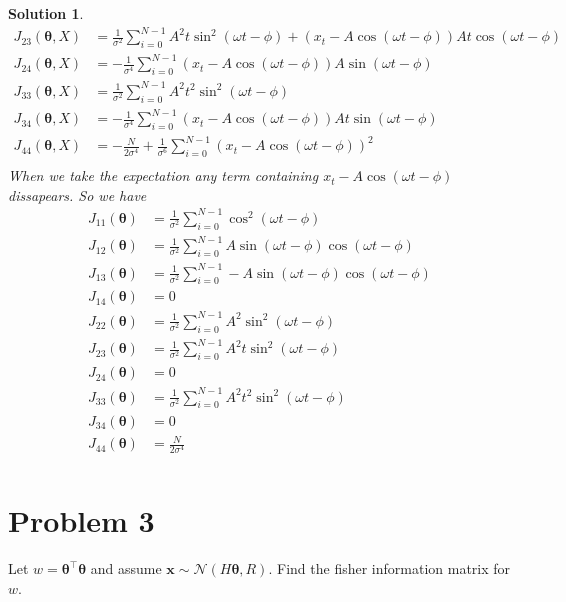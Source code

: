\documentclass[a4paper]{article}
\newtheorem*{sol}{Solution}
\begin{document}
\begin{sol}
\[\begin{aligned}
      J_{23}(\bm{\theta}, X) &= \frac{1}{\sigma^2} \sum_{i=0}^{N-1} A^2t \sin^2(\omega t - \phi) + (x_t - A \cos(\omega t - \phi))At\cos(\omega t - \phi) \\
      J_{24}(\bm{\theta}, X) &= -\frac{1}{\sigma^4} \sum_{i=0}^{N-1} (x_t - A \cos(\omega t - \phi)) A \sin(\omega t - \phi) \\
      J_{33}(\bm{\theta}, X) &= \frac{1}{\sigma^2} \sum_{i=0}^{N-1} A^2 t^2 \sin^2(\omega t - \phi) \\
      J_{34}(\bm{\theta}, X) &= -\frac{1}{\sigma^4} \sum_{i=0}^{N-1} (x_t - A \cos(\omega t - \phi)) At \sin(\omega t - \phi) \\
      J_{44}(\bm{\theta}, X) &= -\frac{N}{2\sigma^4} + \frac{1}{\sigma^6} \sum_{i=0}^{N-1} (x_t - A \cos(\omega t - \phi))^2 \\
    \end{aligned}
  \]
  When we take the expectation any term containing $x_t - A \cos(\omega t - \phi)$ dissapears. So we have
  \[
    \begin{aligned}
      J_{11}(\bm{\theta}) &= \frac{1}{\sigma^2} \sum_{i=0}^{N-1} \cos^2(\omega t - \phi) \\
      J_{12} (\bm{\theta}) &= \frac{1}{\sigma^2} \sum_{i=0}^{N-1} A \sin(\omega t - \phi)\cos(\omega t - \phi) \\
      J_{13} (\bm{\theta}) &=  \frac{1}{\sigma^2} \sum_{i=0}^{N-1} -A \sin(\omega t - \phi)\cos(\omega t - \phi)\\ 
      J_{14} (\bm{\theta}) &= 0 \\
      J_{22}(\bm{\theta}) &= \frac{1}{\sigma^2} \sum_{i=0}^{N-1} A^2 \sin^2(\omega t - \phi) \\
      J_{23}(\bm{\theta}) &= \frac{1}{\sigma^2} \sum_{i=0}^{N-1} A^2t \sin^2(\omega t - \phi) \\
      J_{24}(\bm{\theta}) &= 0 \\
      J_{33}(\bm{\theta}) &= \frac{1}{\sigma^2} \sum_{i=0}^{N-1} A^2 t^2 \sin^2(\omega t - \phi) \\
      J_{34}(\bm{\theta}) &= 0 \\
      J_{44}(\bm{\theta}) &= \frac{N}{2\sigma^4} \\
    \end{aligned}
  \]
\end{sol}

\section*{Problem 3}%
Let $w = \bm{\theta}^\top \bm{\theta}$ and assume $\bm{x} \sim \mathcal{N}( H \bm{\theta}, R)$. Find the fisher information matrix for $w$.
\end{document}
